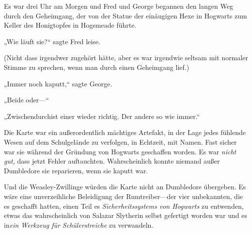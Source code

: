 Es war drei Uhr am Morgen und Fred und George begannen den langen Weg durch den Geheimgang, der von der Statue der einäugigen Hexe in Hogwarts zum Keller des Honigtopfes in Hogsmeade führte.

„Wie läuft sie?“ sagte Fred leise.

(Nicht dass irgendwer zugehört hätte, aber es war irgendwie seltsam mit normaler Stimme zu sprechen, wenn man durch einen Geheimgang lief.)

„Immer noch kaputt,“ sagte George.

„Beide oder—“

„Zwischendurchist einer wieder richtig. Der andere so wie immer.“

Die Karte war ein außerordentlich mächtiges Artefakt, in der Lage jedes fühlende Wesen auf dem Schulgelände zu verfolgen, in Echtzeit, mit Namen. Fast sicher war sie während der Gründung von Hogwarts geschaffen worden. Es war \emph{nicht gut,} dass jetzt Fehler auftauchten. Wahrscheinlich konnte niemand außer Dumbledore sie reparieren, wenn sie kaputt war.

Und die Weasley-Zwillinge würden die Karte nicht an Dumbledore übergeben. Es wäre eine unverzeihliche Beleidigung der Rumtreiber—der vier unbekannten, die es geschafft hatten, einen Teil es \emph{Sicherheitssystems von Hogwarts} zu entwenden, etwas das wahrscheinlich von Salazar Slytherin selbst gefertigt worden war und es in\emph{ein Werkzeug für Schülerstreiche} zu verwandeln.

